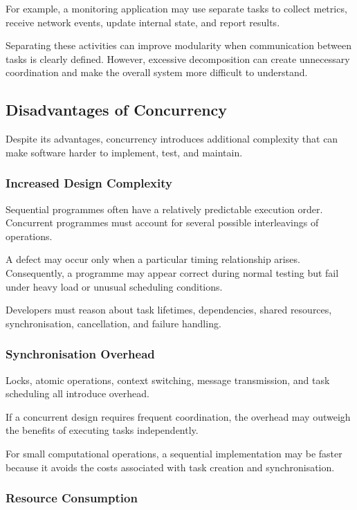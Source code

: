 For example, a monitoring application may use separate tasks to collect metrics, receive network events, update internal state, and report results.

Separating these activities can improve modularity when communication between tasks is clearly defined. However, excessive decomposition can create unnecessary coordination and make the overall system more difficult to understand.

\subsection{Disadvantages of Concurrency}

Despite its advantages, concurrency introduces additional complexity that can make software harder to implement, test, and maintain.

\subsubsection{Increased Design Complexity}

Sequential programmes often have a relatively predictable execution order. Concurrent programmes must account for several possible interleavings of operations.

A defect may occur only when a particular timing relationship arises. Consequently, a programme may appear correct during normal testing but fail under heavy load or unusual scheduling conditions.

Developers must reason about task lifetimes, dependencies, shared resources, synchronisation, cancellation, and failure handling.

\subsubsection{Synchronisation Overhead}

Locks, atomic operations, context switching, message transmission, and task scheduling all introduce overhead.

If a concurrent design requires frequent coordination, the overhead may outweigh the benefits of executing tasks independently.

For small computational operations, a sequential implementation may be faster because it avoids the costs associated with task creation and synchronisation.

\subsubsection{Resource Consumption}

